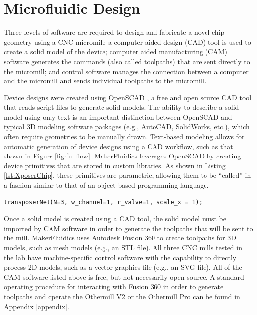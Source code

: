 \section{Microfluidic Design}
\label{sec:mfDesign}

Three levels of software are required to design and fabricate a novel chip geometry using a CNC micromill: a computer aided design (CAD) tool is used to create a solid model of the device; computer aided manufacturing (CAM) software generates the commands (also called toolpaths) that are sent directly to the micromill; and control software manages the connection between a computer and the micromill and sends individual toolpaths to the micromill. 

Device designs were created using OpenSCAD \cite{wikiOpenScad}, a free and open source CAD tool that reads script files to generate solid models. The ability to describe a solid model using only text is an important distinction between OpenSCAD and typical 3D modeling software packages (e.g., AutoCAD, SolidWorks, etc.), which often require geometries to be manually drawn. Text-based modeling allows for automatic generation of device designs using a CAD workflow, such as that shown in Figure \ref{fig:fullflow}. MakerFluidics leverages OpenSCAD by creating device primitives that are stored in custom libraries. As shown in Listing \ref{lst:XposerChip}, these primitives are parametric, allowing them to be ``called'' in a fashion similar to that of an object-based programming language. 

\begin{minipage}{0.95\linewidth}
\centering 
	\begin{lstlisting}[caption={This single line of OpenSCAD creates the 3D model shown in Figure \ref{fig:mfParams}(A). Once a primitive is defined in OpenSCAD, the parameters associated with each device geometry can be modified and the corresponding solid model will adjust to reflect the changes.},label={lst:XposerChip}, frame=single, language=scad]
  transposerNet(N=3, w_channel=1, r_valve=1, scale_x = 1);
\end{lstlisting}
\end{minipage}

Once a solid model is created using a CAD tool, the solid model must be imported by CAM software in order to generate the toolpaths that will be sent to the mill. MakerFluidics uses Autodesk Fusion 360 to create toolpaths for 3D models, such as mesh models (e.g., an STL file). All three CNC mills tested in the lab have machine-specific control software with the capability to directly process 2D models, such as a vector-graphics file (e.g., an SVG file). All of the CAM software listed above is free, but not necessarily open source. A standard operating procedure for interacting with Fusion 360 in order to generate toolpaths and operate the Othermill V2 or the Othermill Pro can be found in Appendix \ref{appendix}.


